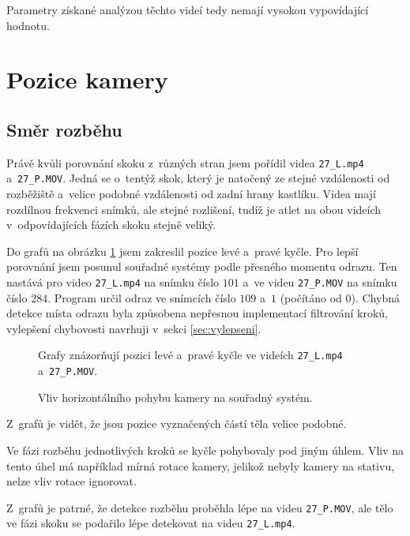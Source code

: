 Parametry získané analýzou těchto videí tedy nemají vysokou vypovídající hodnotu.




\section{Pozice kamery}

\subsection{Směr rozběhu}

Právě kvůli porovnání skoku z~různých stran jsem pořídil videa \texttt{27\_L.mp4} a~\texttt{27\_P.MOV}. Jedná se o~tentýž skok, který je natočený ze stejné vzdálenosti od rozběžiště a~velice podobné vzdálenosti od zadní hrany kastlíku. Videa mají rozdílnou frekvenci snímků, ale stejné rozlišení, tudíž je atlet na obou videích v~odpovídajících fázích skoku stejně veliký.

Do grafů na obrázku \ref{fig:strany} jsem zakreslil pozice levé a~pravé kyčle. Pro lepší porovnání jsem posunul souřadné systémy podle přesného momentu odrazu. Ten nastává pro video \texttt{27\_L.mp4} na snímku číslo $101$ a~ve videu \texttt{27\_P.MOV} na snímku číslo $284$. Program určil odraz ve snímcích číslo $109$ a~$1$ (počítáno od $0$). Chybná detekce místa odrazu byla způsobena nepřesnou implementací filtrování kroků, vylepšení chybovosti navrhuji v~sekci \ref{sec:vylepseni}.

\begin{figure}[h]\centering
    \caption{Vliv horizontálního pohybu kamery na souřadný systém.}
    \small
    Grafy znázorňují pozici levé a~pravé kyčle ve videích \texttt{27\_L.mp4} a~\texttt{27\_P.MOV}.
    \label{fig:strany}
\end{figure}

Z~grafů je vidět, že jsou pozice vyznačených částí těla velice podobné.

Ve fázi rozběhu jednotlivých kroků se kyčle pohybovaly pod jiným úhlem. Vliv na tento úhel má například mírná rotace kamery, jelikož nebyly kamery na stativu, nelze vliv rotace ignorovat.

Z~grafů je patrné, že detekce rozběhu proběhla lépe na videu \texttt{27\_P.MOV}, ale tělo ve fázi skoku se podařilo lépe detekovat na videu \texttt{27\_L.mp4}.

